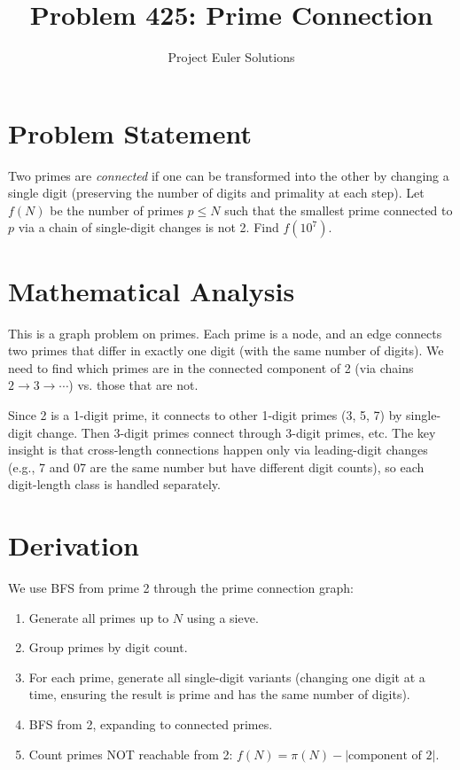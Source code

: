 \documentclass[11pt]{article}
\title{Problem 425: Prime Connection}
\author{Project Euler Solutions}
\date{}
\begin{document}
\maketitle

\section{Problem Statement}
Two primes are \emph{connected} if one can be transformed into the other by changing a single digit (preserving the number of digits and primality at each step). Let $f(N)$ be the number of primes $p \leq N$ such that the smallest prime connected to $p$ via a chain of single-digit changes is not 2. Find $f(10^7)$.

\section{Mathematical Analysis}
This is a graph problem on primes. Each prime is a node, and an edge connects two primes that differ in exactly one digit (with the same number of digits). We need to find which primes are in the connected component of 2 (via chains $2 \to 3 \to \cdots$) vs. those that are not.

Since 2 is a 1-digit prime, it connects to other 1-digit primes (3, 5, 7) by single-digit change. Then 3-digit primes connect through 3-digit primes, etc. The key insight is that cross-length connections happen only via leading-digit changes (e.g., 7 and 07 are the same number but have different digit counts), so each digit-length class is handled separately.

\section{Derivation}
We use BFS from prime 2 through the prime connection graph:
\begin{enumerate}
    \item Generate all primes up to $N$ using a sieve.
    \item Group primes by digit count.
    \item For each prime, generate all single-digit variants (changing one digit at a time, ensuring the result is prime and has the same number of digits).
    \item BFS from 2, expanding to connected primes.
    \item Count primes NOT reachable from 2: $f(N) = \pi(N) - |\text{component of 2}|$.
\end{enumerate}
\end{document}
